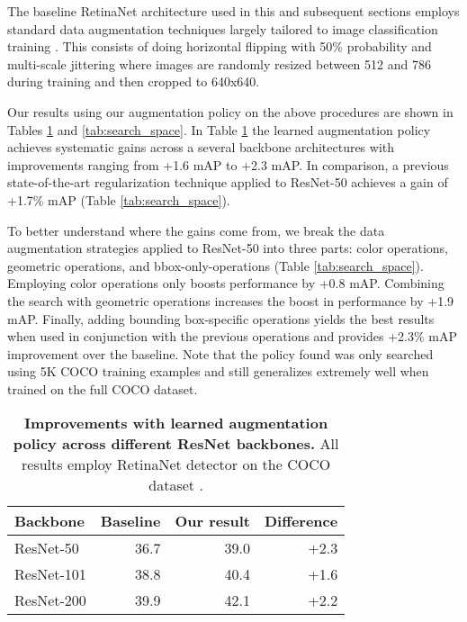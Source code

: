 \documentclass[10pt,twocolumn,letterpaper]{article}
\begin{document}
The baseline RetinaNet architecture used in this and subsequent sections employs standard data augmentation techniques largely tailored to image classification training \cite{lin2017focal}. This consists of doing horizontal flipping with 50\% probability and multi-scale jittering where images are randomly resized between 512 and 786 during training and then cropped to 640x640. 

Our results using our augmentation policy on the above procedures are shown in Tables \ref{tab:across_models} and \ref{tab:search_space}. In Table \ref{tab:across_models} the learned augmentation policy achieves systematic gains across a several backbone architectures with improvements ranging from +1.6 mAP to +2.3 mAP.
In comparison, a previous state-of-the-art regularization technique applied to ResNet-50 \cite{ghiasi2018dropblock} achieves a gain of +1.7\% mAP (Table \ref{tab:search_space}).


To better understand where the gains come from, we break the data augmentation strategies applied to ResNet-50 into three parts: color operations, geometric operations, and bbox-only-operations (Table \ref{tab:search_space}). Employing color operations only boosts performance by +0.8 mAP.
Combining the search with geometric operations increases the boost in performance by +1.9 mAP.
Finally, adding bounding box-specific operations
yields the best results when used in conjunction with the previous operations and provides +2.3\% mAP improvement over the baseline. Note that the policy found was only searched using 5K COCO training examples and still generalizes extremely well when trained on the full COCO dataset.

\begin{table}[t]
\centering
\begin{tabular}{lrrr}
  \hline
  Backbone & Baseline & Our result & Difference  \\
  \hline
  ResNet-50 &  36.7 & 39.0 & +2.3 \\
  ResNet-101 &  38.8 & 40.4 & +1.6 \\
  ResNet-200 &  39.9 & 42.1 & +2.2 \\
  \hline
\end{tabular}
\caption{\textbf{Improvements with learned augmentation policy across different ResNet backbones.} All results employ RetinaNet detector \cite{lin2017focal} on the COCO dataset \cite{lin2014microsoft}.}
\label{tab:across_models}  
\end{table}
\end{document}
